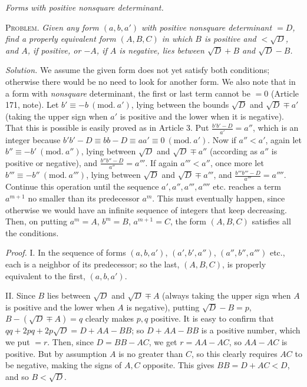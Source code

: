 \begin{center}
\textit{Forms with positive nonsquare determinant.}
\end{center}

\textsc{Problem.} \textit{Given any form $(a,b,a')$ with positive nonsquare determinant $=D$, find a properly equivalent form $(A,B,C)$ in which $B$ is positive and $<\surd D$, and $A$, if positive, or $-A$, if $A$ is negative, lies between $\surd D+B$ and $\surd D-B$.}

\textit{Solution.} We assume the given form does not yet satisfy both conditions; otherwise there would be no need to look for another form. We also note that in a form with \textit{nonsquare} determinant, the first or last term cannot be $=0$ (Article 171, note). Let $b'\equiv-b\ (\mathrm{mod.}\ a')$, lying between the bounds $\surd D$ and $\surd D\mp a'$ (taking the upper sign when $a'$ is positive and the lower when it is negative). That this is possible is easily proved as in Article 3. Put $\frac{b'b'-D}{a'}=a''$, which is an integer because $b'b'-D\equiv bb-D\equiv aa'\equiv0\ (\mathrm{mod.}\ a')$. Now if $a''<a'$, again let $b''\equiv-b'\ (\mathrm{mod.}\ a'')$, lying between $\surd D$ and $\surd D\mp a''$ (according as $a''$ is positive or negative), and $\frac{b''b''-D}{{a''}}=a'''$. If again $a'''<a''$, once more let $b'''\equiv-b''\ (\mathrm{mod.}\ a''')$, lying between $\surd D$ and $\surd D\mp a'''$, and $\frac{b'''b'''-D}{a'''}=a''''$. Continue this operation until the sequence $a',a'',a''',a''''$ etc. reaches a term $a^{m+1}$ no smaller than its predecessor $a^m$. This must eventually happen, since otherwise we would have an infinite sequence of integers that keep decreasing. Then, on putting $a^m=A$, $b^m=B$, $a^{m+1}=C$, the form $(A,B,C)$ satisfies all the conditions.

\textit{Proof.} I. In the sequence of forms $(a,b,a')$, $(a',b',a'')$, $(a'',b'',a''')$ etc., each is a neighbor of its predecessor; so the last, $(A,B,C)$, is properly equivalent to the first, $(a,b,a')$.

II. Since $B$ lies between $\surd D$ and $\surd D\mp A$ (always taking the upper sign when $A$ is positive and the lower when $A$ is negative), putting $\surd D-B=p$, $B-(\surd D\mp A)=q$ clearly makes $p,q$ positive. It is easy to confirm that $qq+2pq+2p\surd D=D+AA-BB$; so $D+AA-BB$ is a positive number, which we put $=r$. Then, since $D=BB-AC$,
we get $r=AA-AC$, so $AA-AC$ is positive. But by assumption $A$ is no greater than $C$, so this clearly requires $AC$ to be negative, making the signs of $A,C$ opposite. This gives $BB=D+AC<D$, and so $B<\surd D$.

